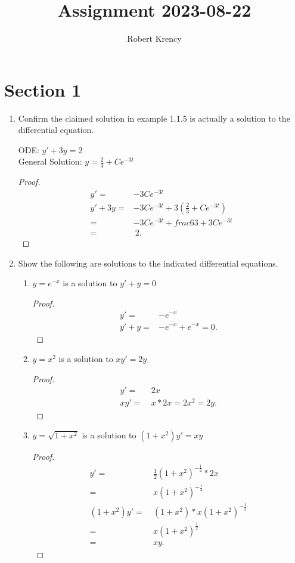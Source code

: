 \documentclass[12pt]{article}
\title{Assignment 2023-08-22}
\author{Robert Krency}
\date{}
\begin{document}
\maketitle

\section*{Section 1}

\begin{enumerate}
  \item Confirm the claimed solution in example 1.1.5 is actually a solution to the differential equation.

  ODE: \(y' + 3y = 2\) \\ 
  General Solution: \(y = \frac{2}{3} + Ce^{-3t}\)

  \begin{proof}
    \begin{align*}
      y' = & -3Ce^{-3t} \\
      y' + 3y = & -3Ce^{-3t} + 3(\frac{2}{3} + Ce^{-3t}) \\
      = & -3Ce^{-3t} + frac{6}{3} + 3Ce^{-3t} \\
      = & \ 2.
    \end{align*}
  \end{proof}
  
  \item Show the following are solutions to the indicated differential equations.
  
  \begin{enumerate}
    \item \(y = e^{-x}\) is a solution to \(y' + y = 0\)
    \begin{proof}
      \begin{align*}
        y' = & -e^{-x} \\
        y' + y = & -e^{-x} + e^{-x} = 0.
      \end{align*}  
    \end{proof}

    \pagebreak
    \item \(y = x^2\) is a solution to \(xy' = 2y\)
    \begin{proof}
      \begin{align*}
        y' = & \ 2x \\
        xy' = & \ x * 2x = 2x^2 = 2y.
      \end{align*}
    \end{proof}
    
    \item \(y = \sqrt{1 + x^2}\) is a solution to \((1 + x^2)y' = xy\)
    \begin{proof}
      \begin{align*}
        y' = &\  \frac{1}{2} {(1 + x^2)}^{-\frac{1}{2}} * 2x \\
        = & \ x {(1 + x^2)}^{-\frac{1}{2}} \\
        (1 + x^2)y' = & \ (1 + x^2) * x {(1 + x^2)}^{-\frac{1}{2}} \\
        = & \ x {(1 + x^2)}^{\frac{1}{2}} \\
        = & \ xy.
      \end{align*}
    \end{proof}


\end{enumerate}
\end{enumerate}
\end{document}
